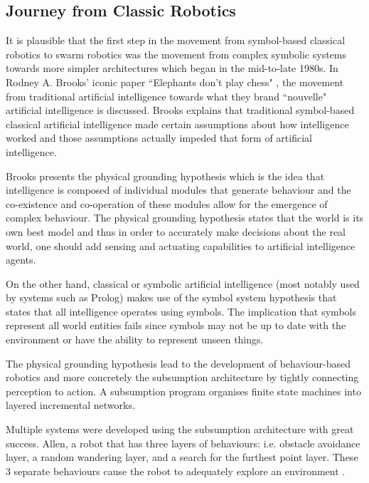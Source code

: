 \subsection{Journey from Classic Robotics}
\label{journeyfromtraditionalAI}

It is plausible that the first step in the movement from symbol-based classical robotics to swarm robotics was the movement from complex symbolic systems towards more simpler architectures which began in the mid-to-late 1980s. In Rodney A. Brooks' iconic paper ``Elephants don't play chess" \cite{brooks1990elephants}, the movement from traditional artificial intelligence towards what they brand ``nouvelle" artificial intelligence is discussed. Brooks explains that traditional symbol-based classical artificial intelligence made certain assumptions about how intelligence worked and those assumptions actually impeded that form of artificial intelligence. 

Brooks presents the physical grounding hypothesis which is the idea that intelligence is composed of individual modules that generate behaviour and the co-existence and co-operation of these modules allow for the emergence of complex behaviour. The physical grounding hypothesis states that the world is its own best model and thus in order to accurately make decisions about the real world, one should add sensing and actuating capabilities to artificial intelligence agents.

On the other hand, classical or symbolic artificial intelligence (most notably used by systems such as Prolog) makes use of the symbol system hypothesis that states that all intelligence operates using symbols. The implication that symbols represent all world entities fails since symbols may not be up to date with the environment or have the ability to represent unseen things. 

The physical grounding hypothesis lead to the development of behaviour-based robotics and more concretely the subsumption architecture \cite{brooks1986robust} by tightly connecting perception to action. A subsumption program organises finite state machines into layered incremental networks. 

Multiple systems were developed using the subsumption architecture with great success. Allen, a robot that has three layers of behaviours: i.e. obstacle avoidance layer, a random wandering layer, and a search for the furthest point layer. These 3 separate behaviours cause the robot to adequately explore an environment \cite{brooks1986robust}.

